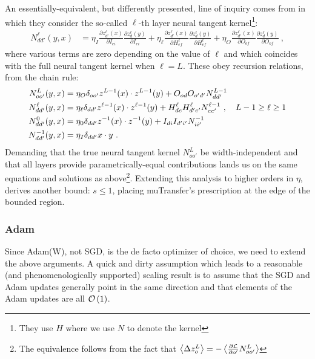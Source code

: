 \documentclass[11pt]{article}
\begin{document}
An essentially-equivalent, but differently presented, line of inquiry comes from
\cite{yaida2022metaprincipledfamilyhyperparameterscaling} in which they consider the so-called $
\ell $-th layer neural tangent kernel\footnote{They use $ H $ where we use $ N $ to denote the
kernel}:
\begin{align}
    N^{ \ell }_{ dd' }(y, x) &= \eta_{ I } \frac{ \partial z ^{ \ell }_{ d' }(x) }{ \partial I_{ ei } }\frac{ \partial z^{ \ell }_{ d }(y) }{ \partial I_{ ei } }
    + \eta_{ \ell }\frac{ \partial z ^{ \ell }_{ d' }(x) }{ \partial H^{ \ell }_{ef} }\frac{ \partial z^{ \ell }_{ d }(y) }{ \partial H^{ \ell }_{ef} }
    + \eta_{ O }\frac{ \partial z ^{ \ell }_{ d' }(x) }{ \partial O_{ of } }\frac{ \partial z^{ \ell }_{ d }(y) }{ \partial O_{of} }\ ,
\end{align}
where various terms are zero depending on the value of $ \ell $ and which coincides with the full
neural tangent kernel when $ \ell=L $. These obey recursion relations, from the chain rule:
\begin{align}
    N^{ L }_{ oo' }(y, x)  &=\eta_{ O }\delta_{ oo' } z^{ L-1 }(x)\cdot z^{ L-1 }(y) + O_{ od }O_{ o'd' }N^{ L-1 }_{ dd' }\nonumber\\
    N^{ \ell }_{ dd' }(y, x)  &=\eta_{ \ell }\delta_{ dd' } z^{ \ell-1 }(x)\cdot z^{ \ell-1 }(y) + H^{ \ell }_{ de }H^{\ell }_{ d'e' }N^{ \ell-1 }_{ ee' } \ , \quad L-1 \ge \ell \ge 1\nonumber\\
    N^{0}_{ dd' }(y, x)  &=\eta_{0}\delta_{ dd' } z^{ -1 }(x)\cdot z^{ -1 }(y) + I_{ di }I_{ d'i' } N^{ -1 }_{ ii' }\nonumber\\
    N^{ -1 }_{ dd' }(y, x)&=\eta_{ I }\delta_{ dd'} x\cdot y \ .
\end{align}
Demanding that the true neural tangent kernel $ N^{ L }_{ oo' } $ be width-independent and that all
layers provide parametrically-equal contributions lands us on the same equations and solutions as
above\footnote{The equivalence follows from the fact that $ \left\langle \Delta z^{ L }_{ o }
\right\rangle = -  \left\langle \frac{ \partial \mathcal{L}  }{ \partial o' } N^{ L }_{ oo' }
\right\rangle  $}. Extending this analysis to higher orders in $ \eta $,
\cite{yaida2022metaprincipledfamilyhyperparameterscaling} derives another bound: $ s\le 1 $, placing
muTransfer's prescription at the edge of the bounded region.

\subsubsection{Adam}

Since Adam(W), not SGD, is the de facto optimizer of choice, we need to extend the above arguments.
A quick and dirty assumption which leads to a reasonable (and phenomenologically supported) scaling
result is to assume that the SGD and Adam updates generally point in the same direction and that
elements of the Adam updates are all $ \mathcal{O} \left( 1 \right)  $.
\end{document}
